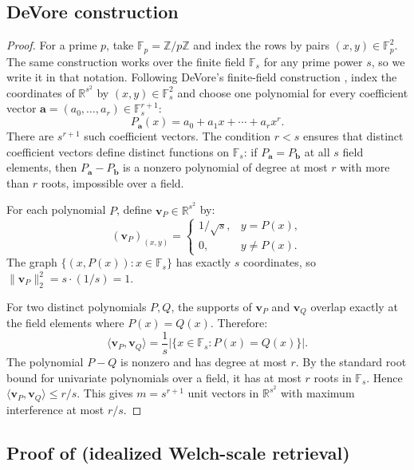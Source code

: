 \documentclass{article}
\newcommand{\1}{\bm{1}}
\newcommand{\norm}[1]{\lVert {#1} \rVert}
\newcommand{\lrangle}[1]{\langle#1\rangle}
\def\va{{\bm{a}}}
\def\vb{{\bm{b}}}
\def\vv{{\bm{v}}}
\newcommand{\R}{\mathbb{R}}
\theoremstyle{definition}
\begin{document}
\subsection{DeVore construction}
\label{app:devore-construct}

\devoreconstruct*
\begin{proof}
  For a prime $p$, take $\mathbb{F}_p=\mathbb{Z}/p\mathbb{Z}$ and index the rows by pairs
  $(x,y)\in\mathbb{F}_p^2$. The same construction works over the finite field $\mathbb{F}_s$ for
  any prime power $s$, so we write it in that notation. Following DeVore's finite-field construction
  \citep{devore07deterministic}, index the coordinates of $\R^{s^2}$ by
  $(x,y)\in\mathbb{F}_s^2$ and choose one polynomial for every coefficient vector
  $\va=(a_0,\dots,a_r)\in\mathbb{F}_s^{r+1}$:
  \[
    P_{\va}(x)=a_0+a_1x+\cdots+a_rx^r .
  \]
  There are $s^{r+1}$ such coefficient vectors. The condition $r<s$ ensures that distinct coefficient
  vectors define distinct functions on $\mathbb{F}_s$: if $P_{\va}=P_{\vb}$ at all $s$ field
  elements, then $P_{\va}-P_{\vb}$ is a nonzero polynomial of degree at most $r$ with more than $r$
  roots, impossible over a field.

  For each polynomial $P$, define $\vv_P\in\R^{s^2}$ by:
  \[
    (\vv_P)_{(x,y)}
    =
    \begin{cases}
      1/\sqrt{s}, & y=P(x),    \\
      0,          & y\ne P(x).
    \end{cases}
  \]
  The graph $\{(x,P(x)):x\in\mathbb{F}_s\}$ has exactly $s$ coordinates, so
  $\norm{\vv_P}_2^2=s\cdot(1/s)=1$.

  For two distinct polynomials $P,Q$, the supports of $\vv_P$ and $\vv_Q$ overlap exactly at the
  field elements where $P(x)=Q(x)$. Therefore:
  \[
    \lrangle{\vv_P,\vv_Q}
    =
    \frac{1}{s}\left|\{x\in\mathbb{F}_s:P(x)=Q(x)\}\right| .
  \]
  The polynomial $P-Q$ is nonzero and has degree at most $r$. By the standard root bound for
  univariate polynomials over a field, it has at most $r$ roots in $\mathbb{F}_s$. Hence
  $\lrangle{\vv_P,\vv_Q}\le r/s$. This gives $m=s^{r+1}$ unit vectors in $\R^{s^2}$ with maximum
  interference at most $r/s$.
\end{proof}

\subsection{\texorpdfstring{Proof of  (idealized Welch-scale retrieval)}{Proof of idealized Welch-scale retrieval}}
\label{app:optimalsnr}
\end{document}
